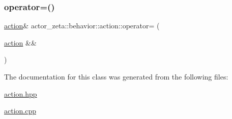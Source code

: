 \subsubsection{\texorpdfstring{operator=()}{operator=()}\hspace{0.1cm}{\footnotesize\ttfamily [2/2]}}
{\footnotesize\ttfamily \hyperlink{classactor__zeta_1_1behavior_1_1action}{action}\& actor\+\_\+zeta\+::behavior\+::action\+::operator= (\begin{DoxyParamCaption}\item[{\hyperlink{classactor__zeta_1_1behavior_1_1action}{action} \&\&}]{ }\end{DoxyParamCaption})\hspace{0.3cm}{\ttfamily [default]}}



The documentation for this class was generated from the following files\+:\begin{DoxyCompactItemize}
\item 
\hyperlink{action_8hpp}{action.\+hpp}\item 
\hyperlink{action_8cpp}{action.\+cpp}\end{DoxyCompactItemize}
